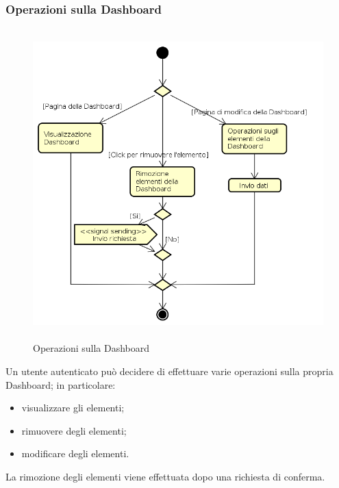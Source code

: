 \subsubsection{Operazioni sulla Dashboard}
\begin{figure}[H]
\begin{center}
\includegraphics[height=12cm]{res/sections/backend/activities/operazioniDashboard.png}
\caption{Operazioni sulla Dashboard}
\end{center}
\end{figure}
Un utente autenticato può decidere di effettuare varie operazioni sulla propria Dashboard; in particolare:
\begin{itemize}
\item visualizzare gli elementi;
\item rimuovere degli elementi;
\item modificare degli elementi.
\end{itemize}
La rimozione degli elementi viene effettuata dopo una richiesta di conferma.
\newpage
